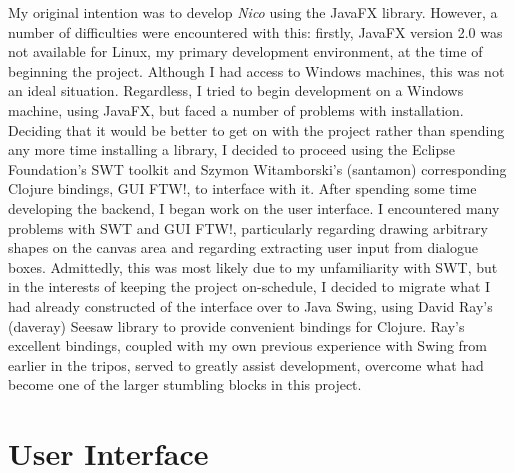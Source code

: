 \documentclass[12pt,twoside,notitlepage,xetex]{report}
\begin{document}
My original intention was to develop \emph{Nico} using the JavaFX library.
However, a number of difficulties were encountered with this: firstly, JavaFX
version 2.0 was not available for Linux, my primary development environment, at
the time of beginning the project.  Although I had access to Windows machines,
this was not an ideal situation.  Regardless, I tried to begin development on a
Windows machine, using JavaFX, but faced a number of problems with
installation.  Deciding that it would be better to get on with the project
rather than spending any more time installing a library, I decided to proceed
using the Eclipse Foundation's SWT toolkit and Szymon Witamborski's (santamon)
corresponding Clojure bindings, GUI FTW!, to interface with it.  After spending
some time developing the backend, I began work on the user interface.  I
encountered many problems with SWT and GUI FTW!, particularly regarding drawing
arbitrary shapes on the canvas area and regarding extracting user input from
dialogue boxes.  Admittedly, this was most likely due to my unfamiliarity with
SWT, but in the interests of keeping the project on-schedule, I decided to
migrate what I had already constructed of the interface over to Java Swing,
using David Ray's (daveray) Seesaw library to provide convenient bindings for
Clojure.  Ray's excellent bindings, coupled with my own previous experience
with Swing from earlier in the tripos, served to greatly assist development,
overcome what had become one of the larger stumbling blocks in this project.

%

%
\section{User Interface}%
\end{document}

